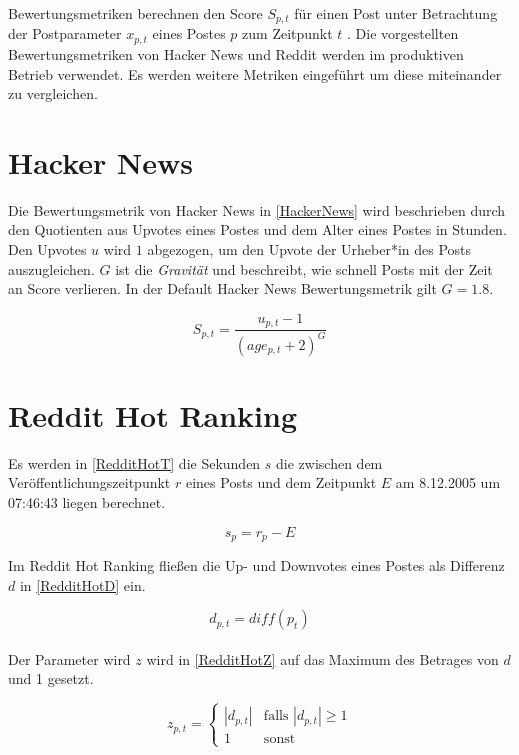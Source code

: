 Bewertungsmetriken berechnen den Score $S_{p,t}$ für einen Post unter Betrachtung der Postparameter $x_{p,t}$ eines Postes $p$ zum Zeitpunkt $t$ . Die vorgestellten Bewertungsmetriken von Hacker News und Reddit werden im produktiven Betrieb verwendet. Es werden weitere Metriken eingeführt um diese miteinander zu vergleichen. 
	
\section{Hacker News}
\label{seqHackerNews}

Die Bewertungsmetrik von Hacker News in \ref{HackerNews} wird beschrieben durch den Quotienten aus Upvotes eines Postes und dem Alter eines Postes in Stunden. Den Upvotes $u$ wird $1$ abgezogen, um den Upvote der Urheber*in des Posts auszugleichen. $G$ ist die \textit{Gravität} und beschreibt, wie schnell Posts mit der Zeit an Score verlieren. In der Default Hacker News Bewertungsmetrik gilt $G = 1.8$.

\begin{equation}
\label{HackerNews}
S_{p,t} = \frac{u_{p,t} - 1}{(age_{p,t} + 2)^{G}}
\end{equation}


\section{Reddit Hot Ranking}

Es werden in \ref{RedditHotT} die Sekunden $s$ die zwischen dem Veröffentlichungszeitpunkt $r$ eines Posts und dem Zeitpunkt $E$ am 8.12.2005 um 07:46:43 liegen berechnet.

\begin{equation}
\label{RedditHotT}
s_{p} = r_{p} - E  
\end{equation}

Im Reddit Hot Ranking fließen die Up- und Downvotes eines Postes als Differenz $d$ in \ref{RedditHotD} ein.  

\begin{equation}
\label{RedditHotD}
d_{p,t} = diff(p_t)
\end{equation}
\\
Der Parameter wird $z$ wird in \ref{RedditHotZ} auf das Maximum des Betrages von $d$ und 1 gesetzt.

\begin{equation}
\label{RedditHotZ}
z_{p,t}  = \begin{cases}
|d_{p,t}| &\text{falls $|d_{p,t}| \geq 1$}\\
1 &\text{sonst}
\end{cases}
\end{equation}


